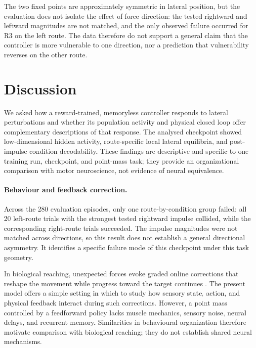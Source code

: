 \documentclass{article}
\begin{document}
The two fixed points are approximately symmetric in lateral position, but
the evaluation does not isolate the effect of force direction: the tested
rightward and leftward magnitudes are not matched, and the only observed
failure occurred for R3 on the left route. The data therefore do not
support a general claim that the controller is more vulnerable to one
direction, nor a prediction that vulnerability reverses on the other route.

\section{Discussion}

We asked how a reward-trained, memoryless controller responds to lateral
perturbations and whether its population activity and physical closed loop
offer complementary descriptions of that response. The analysed checkpoint
showed low-dimensional hidden activity, route-specific local lateral
equilibria, and post-impulse condition decodability. These findings are
descriptive and specific to one training run, checkpoint, and point-mass
task; they provide an organizational comparison with motor neuroscience,
not evidence of neural equivalence.

\paragraph{Behaviour and feedback correction.}

Across the 280 evaluation episodes, only one route-by-condition group
failed: all 20 left-route trials with the strongest tested rightward impulse
collided, while the corresponding right-route trials succeeded. The impulse
magnitudes were not matched across directions, so this result does not
establish a general directional asymmetry. It identifies a specific
failure mode of this checkpoint under this task geometry.

In biological reaching, unexpected forces evoke graded online corrections
that reshape the movement while progress toward the target continues
\citep{Pruszynski2012,Nashed2014,FlashHogan1985,Scott2004,Dimitriou2013,Shadmehr1994,Diedrichsen2010}.
The present model offers a simple setting in which to study how sensory
state, action, and physical feedback interact during such corrections.
However, a point mass controlled by a feedforward policy lacks muscle
mechanics, sensory noise, neural delays, and recurrent memory. Similarities
in behavioural organization therefore motivate comparison with biological
reaching; they do not establish shared neural mechanisms.
\end{document}
